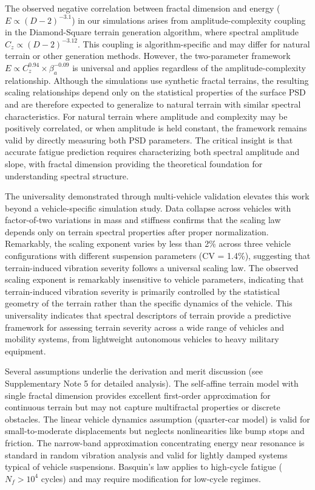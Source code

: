 \documentclass[11pt]{article}
\begin{document}
The observed negative correlation between fractal dimension and energy ($E \propto (D-2)^{-3.1}$) in our simulations arises from amplitude-complexity coupling in the Diamond-Square terrain generation algorithm, where spectral amplitude $C_z \propto (D-2)^{-3.12}$. This coupling is algorithm-specific and may differ for natural terrain or other generation methods. However, the two-parameter framework $E \propto C_z^{0.94} \times \beta_a^{-0.09}$ is universal and applies regardless of the amplitude-complexity relationship. Although the simulations use synthetic fractal terrains, the resulting scaling relationships depend only on the statistical properties of the surface PSD and are therefore expected to generalize to natural terrain with similar spectral characteristics. For natural terrain where amplitude and complexity may be positively correlated, or when amplitude is held constant, the framework remains valid by directly measuring both PSD parameters. The critical insight is that accurate fatigue prediction requires characterizing both spectral amplitude and slope, with fractal dimension providing the theoretical foundation for understanding spectral structure.

The universality demonstrated through multi-vehicle validation elevates this work beyond a vehicle-specific simulation study. Data collapse across vehicles with factor-of-two variations in mass and stiffness confirms that the scaling law depends only on terrain spectral properties after proper normalization. Remarkably, the scaling exponent varies by less than 2\% across three vehicle configurations with different suspension parameters (CV = 1.4\%), suggesting that terrain-induced vibration severity follows a universal scaling law. The observed scaling exponent is remarkably insensitive to vehicle parameters, indicating that terrain-induced vibration severity is primarily controlled by the statistical geometry of the terrain rather than the specific dynamics of the vehicle. This universality indicates that spectral descriptors of terrain provide a predictive framework for assessing terrain severity across a wide range of vehicles and mobility systems, from lightweight autonomous vehicles to heavy military equipment.

Several assumptions underlie the derivation and merit discussion (see Supplementary Note 5 for detailed analysis). The self-affine terrain model with single fractal dimension provides excellent first-order approximation for continuous terrain but may not capture multifractal properties or discrete obstacles\cite{Persson2005}. The linear vehicle dynamics assumption (quarter-car model) is valid for small-to-moderate displacements but neglects nonlinearities like bump stops and friction\cite{Wong2022,Gillespie1992}. The narrow-band approximation concentrating energy near resonance is standard in random vibration analysis\cite{Miles1954,Bendat2010} and valid for lightly damped systems typical of vehicle suspensions. Basquin's law applies to high-cycle fatigue ($N_f > 10^4$ cycles) and may require modification for low-cycle regimes\cite{Dowling2013}.
\end{document}
